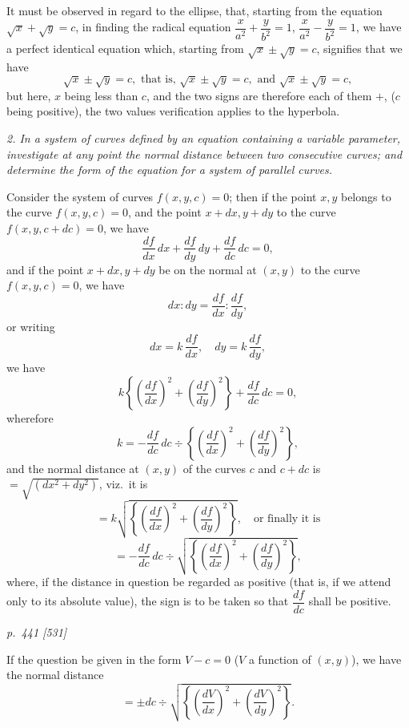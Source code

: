\documentclass[11pt,a4paper]{article}
\theoremstyle{plain}
\theoremstyle{definition}
\begin{document}
It must be observed in regard to the ellipse, that, starting from the equation
$\sqrt{x} + \sqrt{y} = c$, in finding the radical equation $\dfrac{x}{a^2} + \dfrac{y}{b^2} = 1$, $\dfrac{x}{a^2} - \dfrac{y}{b^2} = 1$, we have a perfect
identical equation which, starting from $\sqrt{x} \pm \sqrt{y} = c$, signifies that we have
\[
\sqrt{x} \pm \sqrt{y} = c, \text{ that is, } \sqrt{x} \pm \sqrt{y} = c, \text{ and } \sqrt{x} \pm \sqrt{y} = c,
\]
but here, $x$ being less than $c$, and the two signs are therefore each of them $+$, ($c$ being positive), the two values verification applies to the hyperbola.

\textit{2. In a system of curves defined by an equation containing a variable parameter, investigate at any point the normal distance between two consecutive curves; and determine the form of the equation for a system of parallel curves.}

Consider the system of curves $f(x, y, c) = 0$; then if the point $x, y$ belongs to the curve $f(x, y, c) = 0$, and the point $x + dx, y + dy$ to the curve $f(x, y, c + dc) = 0$, we have
\[
\frac{df}{dx}\,dx + \frac{df}{dy}\,dy + \frac{df}{dc}\,dc = 0,
\]
and if the point $x + dx, y + dy$ be on the normal at $(x, y)$ to the curve $f(x, y, c) = 0$, we have
\[
dx : dy = \frac{df}{dx} : \frac{df}{dy},
\]
or writing
\[
dx = k\,\frac{df}{dx},\quad dy = k\,\frac{df}{dy},
\]
we have
\[
k\left\{\left(\frac{df}{dx}\right)^2 + \left(\frac{df}{dy}\right)^2\right\} + \frac{df}{dc}\,dc = 0,
\]
wherefore
\[
k = -\frac{df}{dc}\,dc\div \left\{\left(\frac{df}{dx}\right)^2 + \left(\frac{df}{dy}\right)^2\right\},
\]
and the normal distance at $(x, y)$ of the curves $c$ and $c + dc$ is $= \sqrt{(dx^2 + dy^2)}$, viz.\ it is
\[
= k\sqrt{\left\{\left(\frac{df}{dx}\right)^2 + \left(\frac{df}{dy}\right)^2\right\}},\quad \text{or finally it is}
\]
\[
= -\frac{df}{dc}\,dc\div \sqrt{\left\{\left(\frac{df}{dx}\right)^2 + \left(\frac{df}{dy}\right)^2\right\}},
\]
where, if the distance in question be regarded as positive (that is, if we attend only
to its absolute value), the sign is to be taken so that $\dfrac{df}{dc}$ shall be positive.

\clearpage

\bigskip
\textit{p.~441 [531]}
\smallskip

If the question be given in the form $V - c = 0$ ($V$ a function of $(x, y)$), we have the
normal distance
\[
= \pm dc \div \sqrt{\left\{\left(\frac{dV}{dx}\right)^2 + \left(\frac{dV}{dy}\right)^2\right\}}.
\]
\end{document}

